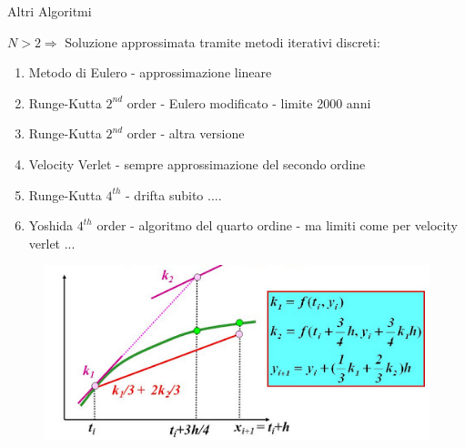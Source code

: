         \begin{frame}{Altri Algoritmi}
            \begin{exampleblock}{$N>2 \Rightarrow$ Soluzione approssimata tramite metodi iterativi discreti:}
                \begin{enumerate}
                    \item Metodo di Eulero - approssimazione lineare
                    \item Runge-Kutta $2^{nd}$ order - Eulero modificato - limite 2000 anni
                    \item Runge-Kutta $2^{nd}$ order - altra versione
                    \item Velocity Verlet - sempre approssimazione del secondo ordine
                    \item Runge-Kutta $4^{th}$ - drifta subito ....
                    \item Yoshida $4^{th}$ order - algoritmo del quarto ordine - ma limiti come per velocity verlet ...
                \end{enumerate}
            \end{exampleblock}
            \begin{figure}
                \centering
                \includegraphics[width=0.5\linewidth]{2_approx/kutta.png}
                \label{fig:kutt}
            \end{figure}
        \end{frame}
